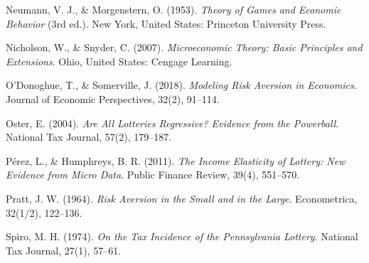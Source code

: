 \documentclass[11pt, oneside]{book}
\begin{document}
\begin{thebibliography}{111}
 Neumann, V. J., \& Morgenstern, O. (1953). \textit{Theory of Games and Economic Behavior} (3rd ed.). New York, United States: Princeton University Press.

 Nicholson, W., \& Snyder, C. (2007). \textit{Microeconomic Theory: Basic Principles and Extensions}. Ohio, United States: Cengage Learning.

 O’Donoghue, T., \& Somerville, J. (2018). \textit{Modeling Risk Aversion in Economics}. Journal of Economic Perspectives, 32(2), 91–114.

 Oster, E. (2004). \textit{Are All Lotteries Regressive? Evidence from the Powerball}. National Tax Journal, 57(2), 179–187.

 Pérez, L., \& Humphreys, B. R. (2011). \textit{The Income Elasticity of Lottery: New Evidence from Micro Data}. Public Finance Review, 39(4), 551–570. 

 Pratt, J. W. (1964). \textit{Risk Aversion in the Small and in the Large}. Econometrica, 32(1/2), 122–136. 

 Spiro, M. H. (1974). \textit{On the Tax Incidence of the Pennsylvania Lottery}. National Tax Journal, 27(1), 57–61. 


































\end{thebibliography}
\end{document}
